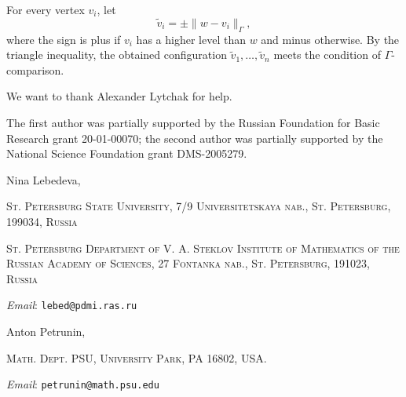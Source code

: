 \documentclass{article}
\makeatletter
\newcommand{\Addresses}{{\bigskip\footnotesize

\noindent Nina Lebedeva,
\par\nopagebreak
 \textsc{St. Petersburg State University, 7/9 Universitetskaya nab., St. Petersburg, 199034, Russia}
\par
\nopagebreak
 \textsc{St. Petersburg Department of V. A. Steklov Institute of Mathematics of the Russian Academy of Sciences, 27 Fontanka nab., St. Petersburg, 191023, Russia}
  \par\nopagebreak
  \textit{Email}: \texttt{lebed@pdmi.ras.ru}

\medskip

\noindent   Anton Petrunin, 
\par\nopagebreak
 \textsc{Math. Dept. PSU, University Park, PA 16802, USA.}
  \par\nopagebreak
  \textit{Email}: \texttt{petrunin@math.psu.edu}
  
}}
\makeatother
\begin{document}
For every vertex $v_i$, let
\[\tilde v_i=\pm \|w-v_i\|_\Gamma,\]
where the sign is plus if $v_i$ has a higher level than $w$ and minus otherwise.
By the triangle inequality, the obtained configuration $\tilde v_1,\dots,\tilde v_n$ meets the condition of $\Gamma$-comparison.
\qeds


We want to thank Alexander Lytchak for help. 

The first author was partially supported by the Russian Foundation for Basic Research grant 20-01-00070; the second author was partially supported by the National Science Foundation grant DMS-2005279.

{\sloppy
\printbibliography[heading=bibintoc]
\fussy
}

\Addresses
\end{document}
